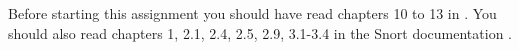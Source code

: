 Before starting this assignment you should have read chapters 10 to 13 in
\citet{Stallings2013nse}. You should also read chapters 1, 2.1, 2.4, 2.5, 2.9,
3.1-3.4 in the Snort documentation \citep{snort}.
